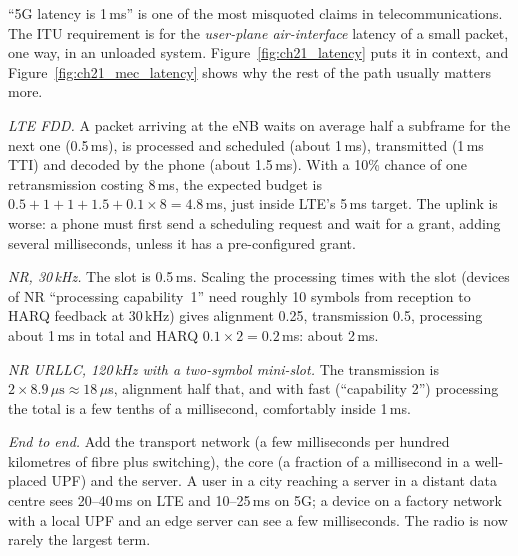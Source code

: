 ``5G latency is 1\,ms'' is one of the most misquoted claims in telecommunications. The ITU
requirement is for the \emph{user-plane air-interface} latency of a small packet, one way, in an
unloaded system. Figure~\ref{fig:ch21_latency} puts it in context, and
Figure~\ref{fig:ch21_mec_latency} shows why the rest of the path usually matters more.

\begin{worked}
\emph{LTE FDD.} A packet arriving at the eNB waits on average half a subframe for the next one
(0.5\,ms), is processed and scheduled (about 1\,ms), transmitted (1\,ms TTI) and decoded by the phone
(about 1.5\,ms). With a 10\% chance of one retransmission costing 8\,ms, the expected budget is
$0.5+1+1+1.5+0.1\times8=4.8$\,ms, just inside LTE's 5\,ms target. The uplink is worse: a phone must
first send a scheduling request and wait for a grant, adding several milliseconds, unless it has a
pre-configured grant.

\emph{NR, 30\,kHz.} The slot is 0.5\,ms. Scaling the processing times with the slot (devices of NR
``processing capability~1'' need roughly 10 symbols from reception to HARQ feedback at 30\,kHz) gives
alignment 0.25, transmission 0.5, processing about 1\,ms in total and HARQ $0.1\times2=0.2$\,ms:
about 2\,ms.

\emph{NR URLLC, 120\,kHz with a two-symbol mini-slot.} The transmission is
$2\times8.9\,\mu\mathrm{s}\approx18\,\mu$s, alignment half that, and with fast (``capability 2'')
processing the total is a few tenths of a millisecond, comfortably inside 1\,ms.

\emph{End to end.} Add the transport network (a few milliseconds per hundred kilometres of fibre plus
switching), the core (a fraction of a millisecond in a well-placed UPF) and the server. A user in a
city reaching a server in a distant data centre sees 20--40\,ms on LTE and 10--25\,ms on 5G; a device
on a factory network with a local UPF and an edge server can see a few milliseconds. The radio is now
rarely the largest term.
\end{worked}



